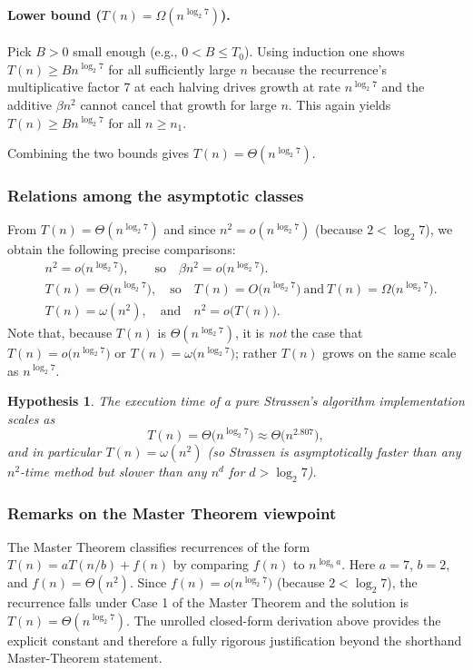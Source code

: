 \documentclass[11pt, a4paper, titlepage]{scrartcl}
\newtheorem{hypothesis}{Hypothesis}
\begin{document}
\paragraph{Lower bound ($T(n)=\Omega(n^{\log_2 7})$).}  
Pick $B>0$ small enough (e.g., $0<B\le T_0$). Using induction one shows $T(n)\ge B n^{\log_2 7}$ for all sufficiently large $n$ because the recurrence's multiplicative factor $7$ at each halving drives growth at rate $n^{\log_2 7}$ and the additive $\beta n^2$ cannot cancel that growth for large $n$. This again yields $T(n)\ge B n^{\log_2 7}$ for all $n\ge n_1$.

Combining the two bounds gives $T(n)=\Theta(n^{\log_2 7})$.

\subsubsection{Relations among the asymptotic classes}
From $T(n)=\Theta(n^{\log_2 7})$ and since $n^2 = o(n^{\log_2 7})$ (because $2 < \log_2 7$), we obtain the following precise comparisons:
\begin{align*}
& n^2 = o\bigl(n^{\log_2 7}\bigr), \qquad \text{so}\quad \beta n^2 = o\bigl(n^{\log_2 7}\bigr). \\
& T(n) = \Theta\bigl(n^{\log_2 7}\bigr), \quad\text{so}\quad T(n) = O\bigl(n^{\log_2 7}\bigr)\ \text{and}\ T(n)=\Omega\bigl(n^{\log_2 7}\bigr). \\
& T(n)=\omega(n^2), \quad\text{and}\quad n^2 = o\bigl(T(n)\bigr).
\end{align*}
Note that, because $T(n)$ is $\Theta(n^{\log_2 7})$, it is \emph{not} the case that $T(n)=o\!\bigl(n^{\log_2 7}\bigr)$ or $T(n)=\omega\!\bigl(n^{\log_2 7}\bigr)$; rather $T(n)$ grows on the same scale as $n^{\log_2 7}$.

\begin{hypothesis}
The execution time of a pure Strassen's algorithm implementation scales as
\[
T(n) = \Theta\!\bigl(n^{\log_2 7}\bigr) \approx \Theta\!\bigl(n^{2.807}\bigr),
\]
and in particular $T(n)=\omega(n^2)$ (so Strassen is asymptotically faster than any $n^2$-time method but slower than any $n^{d}$ for $d>\log_2 7$).
\end{hypothesis}

\subsubsection{Remarks on the Master Theorem viewpoint}
The Master Theorem classifies recurrences of the form $T(n)=aT(n/b)+f(n)$ by comparing $f(n)$ to $n^{\log_b a}$. Here $a=7$, $b=2$, and $f(n)=\Theta(n^2)$. Since $f(n)=o\!\bigl(n^{\log_2 7}\bigr)$ (because $2 < \log_2 7$), the recurrence falls under Case 1 of the Master Theorem and the solution is $T(n)=\Theta(n^{\log_2 7})$. The unrolled closed-form derivation above provides the explicit constant and therefore a fully rigorous justification beyond the shorthand Master-Theorem statement.
\end{document}
